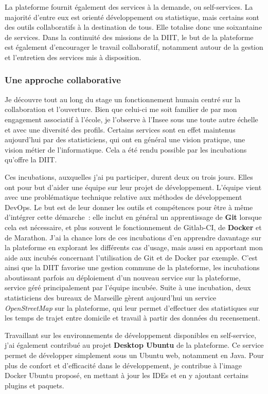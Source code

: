 La plateforme fournit également des services à la demande, ou self-services. La majorité d'entre eux est orienté développement ou statistique, mais certains sont des outils collaboratifs à la destination de tous. Elle totalise donc une soixantaine de services. Dans la continuité des missions de la DIIT, le but de la plateforme est également d'encourager le travail collaboratif, notamment autour de la gestion et l'entretien des services mis à disposition.

\subsubsection{Une approche collaborative}
Je découvre tout au long du stage un fonctionnement humain centré sur la collaboration et l'ouverture. Bien que celui-ci me soit familier de par mon engagement associatif à l'école, je l'observe à l'Insee sous une toute autre échelle et avec une diversité des profils. Certains services sont en effet maintenus aujourd'hui par des statisticiens, qui ont en général une vision pratique, une vision métier de l'informatique. Cela a été rendu possible par les incubations qu'offre la DIIT.
\newline

Ces incubations, auxquelles j'ai pu participer, durent deux ou trois jours. Elles ont pour but d'aider une équipe sur leur projet de développement. L'équipe vient avec une problématique technique relative aux méthodes de développement DevOps. Le but est de leur donner les outils et compétences pour être à même d'intégrer cette démarche~: elle inclut en général un apprentissage de \textbf{Git} lorsque cela est nécessaire, et plus souvent le fonctionnement de Gitlab-CI, de \textbf{Docker} et de Marathon. J'ai la chance lors de ces incubations d'en apprendre davantage sur la plateforme en explorant les différents cas d'usage, mais aussi en apportant mon aide aux incubés concernant l'utilisation de Git et de Docker par exemple. C'est ainsi que la DIIT favorise une gestion commune de la plateforme, les incubations aboutissant parfois au déploiement d'un nouveau service sur la plateforme, service géré principalement par l'équipe incubée. Suite à une incubation, deux statisticiens des bureaux de Marseille gèrent aujourd'hui un service \textit{OpenStreetMap} sur la plateforme, qui leur permet d'effectuer des statistiques sur les temps de trajet entre domicile et travail à partir des données du recensement.
\newline

Travaillant sur les environnements de développement disponibles en self-service, j'ai également contribué au projet \textbf{Desktop Ubuntu} de la plateforme. Ce service permet de développer simplement sous un Ubuntu web, notamment en Java. Pour plus de confort et d'efficacité dans le développement, je contribue à l'image Docker Ubuntu proposé, en mettant à jour les IDEs et en y ajoutant certains plugins et paquets.
\label{section 2.2.2}

